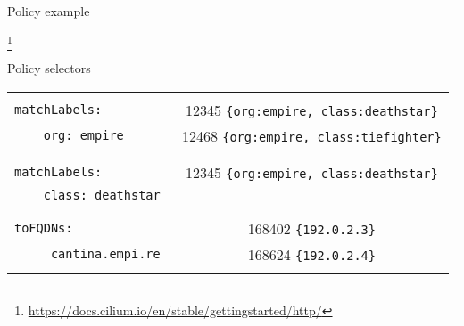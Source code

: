 \documentclass[black,white]{beamer}
\newcommand\blfootnote[1]{%
  \begingroup
  \renewcommand\thefootnote{}\footnote{#1}%
  \addtocounter{footnote}{-1}%
  \endgroup
}
\DeclareRobustCommand{\#}{\adjustbox{valign=B,totalheight=.57\baselineskip}{\oldhash}}%
\begin{document}

    \begin{frame}{Policy example}
        
        \blfootnote{\tiny \url{https://docs.cilium.io/en/stable/gettingstarted/http/}}
    \end{frame}

    \begin{frame}[fragile]{Policy selectors}
        \begin{tabular}{ | l | c | }
            \hline
            & \\
            \verb+matchLabels:+ & 12345 \verb+{org:empire, class:deathstar}+ \\
            \verb+    org: empire+ & 12468 \verb+{org:empire, class:tiefighter}+ \\
            & \\
            \hline
            & \\
            \verb+matchLabels:+ & 12345 \verb+{org:empire, class:deathstar}+ \\
            \verb+    class: deathstar+ & \\
            & \\
            \hline
            & \\
            \verb+toFQDNs:+ & 168402 \verb+{192.0.2.3}+ \\
            \verb+     cantina.empi.re + & 168624 \verb+{192.0.2.4}+ \\
            & \\
            \hline
        \end{tabular}
    \end{frame}
\end{document}
